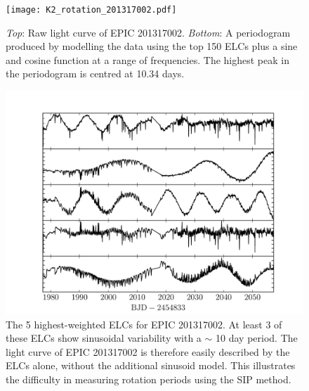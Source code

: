 \documentclass[useAMS, usenatbib, preprint, 12pt]{aastex}
\begin{document}
\begin{figure}
\begin{center}
\texttt{[image: K2\_rotation\_201317002.pdf]}
\caption{{\it Top}: Raw light curve of EPIC 201317002. {\it Bottom}: A
periodogram produced by modelling the data using the top 150 ELCs
plus a sine and cosine function at a range of frequencies. The highest peak in
the periodogram is centred at 10.34 days.}
\label{fig:K2_rotation_poster_child}
\end{center}
\end{figure}

\begin{figure}
\begin{center}
\includegraphics[width=6in, clip=true]{201317002_top5.pdf}
\caption{The 5 highest-weighted ELCs for EPIC 201317002. At least 3 of these
	ELCs show sinusoidal variability with a $\sim$ 10 day period.
	The light curve of EPIC 201317002 is therefore easily described by the
	ELCs alone, without the additional sinusoid model.
	This illustrates the difficulty in measuring rotation periods using the
	SIP method.}
\label{fig:top5}
\end{center}
\end{figure}
\end{document}
